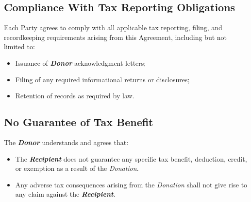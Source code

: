 \subsection{Compliance With Tax Reporting Obligations}
Each Party agrees to comply with all applicable tax reporting, filing, and recordkeeping requirements arising from this Agreement, including but not limited to:
\begin{itemize}
  \item Issuance of \textbf{\textit{Donor}} acknowledgment letters;
  \item Filing of any required informational returns or disclosures;
  \item Retention of records as required by law.
\end{itemize}

\subsection{No Guarantee of Tax Benefit}
The \textbf{\textit{Donor}} understands and agrees that:
\begin{itemize}
  \item The \textbf{\textit{Recipient}} does not guarantee any specific tax benefit, deduction, credit, or exemption as a result of the \textit{Donation}.
  \item Any adverse tax consequences arising from the \textit{Donation} shall not give rise to any claim against the \textbf{\textit{Recipient}}.
\end{itemize}

